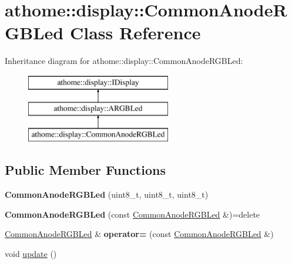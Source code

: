 \hypertarget{classathome_1_1display_1_1_common_anode_r_g_b_led}{}\section{athome\+:\+:display\+:\+:Common\+Anode\+R\+G\+B\+Led Class Reference}
\label{classathome_1_1display_1_1_common_anode_r_g_b_led}
Inheritance diagram for athome\+:\+:display\+:\+:Common\+Anode\+R\+G\+B\+Led\+:\begin{figure}[H]
\begin{center}
\leavevmode
\includegraphics[height=3.000000cm]{classathome_1_1display_1_1_common_anode_r_g_b_led}
\end{center}
\end{figure}
\subsection*{Public Member Functions}
\begin{DoxyCompactItemize}
\item 
\mbox{\label{classathome_1_1display_1_1_common_anode_r_g_b_led_a3695455b373a3ec0f7bb0ea76eee6e36}} 
{\bfseries Common\+Anode\+R\+G\+B\+Led} (uint8\+\_\+t, uint8\+\_\+t, uint8\+\_\+t)
\item 
\mbox{\label{classathome_1_1display_1_1_common_anode_r_g_b_led_a79535998b06fdc7046bf8006ad1e3eb6}} 
{\bfseries Common\+Anode\+R\+G\+B\+Led} (const \mbox{\hyperlink{classathome_1_1display_1_1_common_anode_r_g_b_led}{Common\+Anode\+R\+G\+B\+Led}} \&)=delete
\item 
\mbox{\label{classathome_1_1display_1_1_common_anode_r_g_b_led_a59e331dcbb1d7b028b932148c30f000f}} 
\mbox{\hyperlink{classathome_1_1display_1_1_common_anode_r_g_b_led}{Common\+Anode\+R\+G\+B\+Led}} \& {\bfseries operator=} (const \mbox{\hyperlink{classathome_1_1display_1_1_common_anode_r_g_b_led}{Common\+Anode\+R\+G\+B\+Led}} \&)
\item 
void \mbox{\hyperlink{classathome_1_1display_1_1_common_anode_r_g_b_led_ab7daf7dcc6ac1e3fcab202cae484b237}{update}} ()
\end{DoxyCompactItemize}


